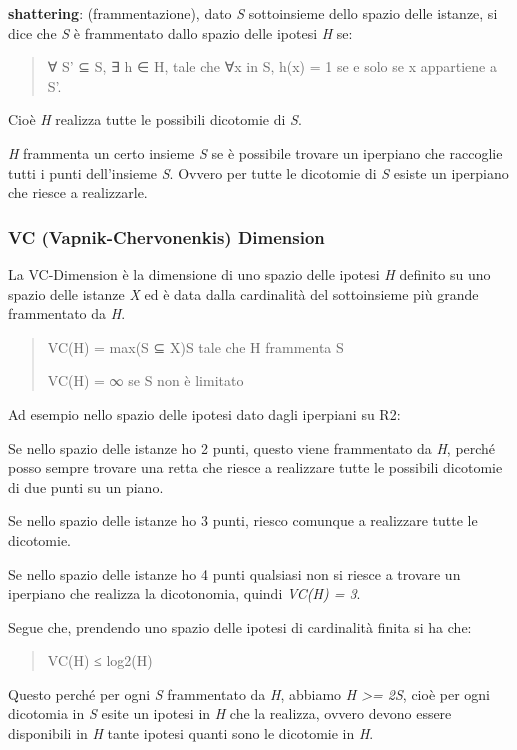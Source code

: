 \textbf{shattering}: (frammentazione), dato \emph{S} sottoinsieme dello
spazio delle istanze, si dice che \emph{S} è frammentato dallo spazio
delle ipotesi \emph{H} se:

\begin{quote}
∀ S' ⊆ S, ∃ h ∈ H, tale che ∀x in S, h(x) = 1 se e solo se x appartiene
a S'.
\end{quote}

Cioè \emph{H} realizza tutte le possibili dicotomie di \emph{S}.

\emph{H} frammenta un certo insieme \emph{S} se è possibile trovare un
iperpiano che raccoglie tutti i punti dell'insieme \emph{S}. Ovvero per
tutte le dicotomie di \emph{S} esiste un iperpiano che riesce a
realizzarle.

\subsubsection{VC (Vapnik-Chervonenkis)
Dimension}\label{vc-vapnik-chervonenkis-dimension}

La VC-Dimension è la dimensione di uno spazio delle ipotesi \emph{H}
definito su uno spazio delle istanze \emph{X} ed è data dalla
cardinalità del sottoinsieme più grande frammentato da \emph{H}.

\begin{quote}
VC(H) = max(S ⊆ X)\textbar{}S\textbar{} tale che H frammenta S

VC(H) = ∞ se S non è limitato
\end{quote}

Ad esempio nello spazio delle ipotesi dato dagli iperpiani su R2:

Se nello spazio delle istanze ho 2 punti, questo viene frammentato da
\emph{H}, perché posso sempre trovare una retta che riesce a realizzare
tutte le possibili dicotomie di due punti su un piano.

Se nello spazio delle istanze ho 3 punti, riesco comunque a realizzare
tutte le dicotomie.

Se nello spazio delle istanze ho 4 punti qualsiasi non si riesce a
trovare un iperpiano che realizza la dicotonomia, quindi \emph{VC(H) =
3}.

Segue che, prendendo uno spazio delle ipotesi di cardinalità finita si
ha che:

\begin{quote}
VC(H) ≤ log2(\textbar{}H\textbar{})
\end{quote}

Questo perché per ogni \emph{S} frammentato da \emph{H}, abbiamo
\emph{\textbar{}H\textbar{} \textgreater{}= 2\textbar{}S\textbar{}},
cioè per ogni dicotomia in \emph{S} esite un ipotesi in \emph{H} che la
realizza, ovvero devono essere disponibili in \emph{H} tante ipotesi
quanti sono le dicotomie in \emph{H}.

